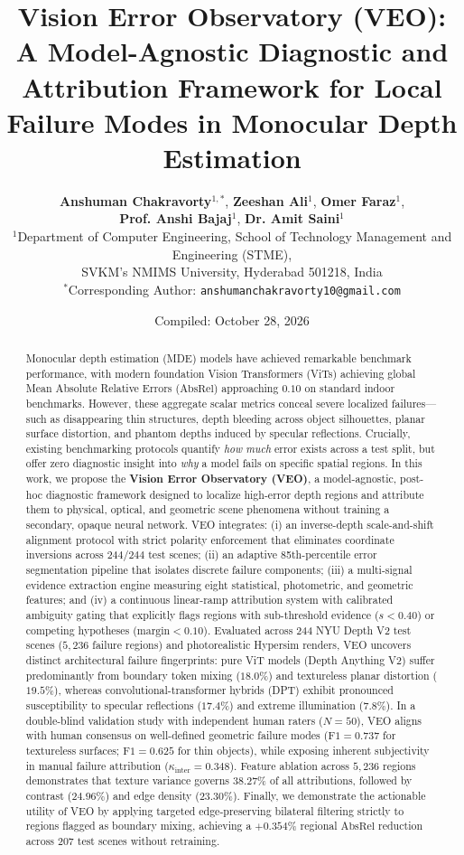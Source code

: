 \documentclass[11pt,a4paper]{article}
\title{\textbf{\Large Vision Error Observatory (VEO): A Model-Agnostic Diagnostic and Attribution Framework for Local Failure Modes in Monocular Depth Estimation}}
\author{
  \textbf{Anshuman Chakravorty}$^{1,*}$, \quad
  \textbf{Zeeshan Ali}$^{1}$, \quad
  \textbf{Omer Faraz}$^{1}$, \\
  \textbf{Prof. Anshi Bajaj}$^{1}$, \quad
  \textbf{Dr. Amit Saini}$^{1}$ \\[0.5em]
  \small $^{1}$Department of Computer Engineering, School of Technology Management and Engineering (STME), \\
  \small SVKM's NMIMS University, Hyderabad 501218, India \\[0.3em]
  \small $^{*}$Corresponding Author: \texttt{anshumanchakravorty10@gmail.com}
}
\date{\small Compiled: October 28, 2026}
\begin{document}
\maketitle

\begin{abstract}
Monocular depth estimation (MDE) models have achieved remarkable benchmark performance, with modern foundation Vision Transformers (ViTs) achieving global Mean Absolute Relative Errors ($\text{AbsRel}$) approaching $0.10$ on standard indoor benchmarks. However, these aggregate scalar metrics conceal severe localized failures—such as disappearing thin structures, depth bleeding across object silhouettes, planar surface distortion, and phantom depths induced by specular reflections. Crucially, existing benchmarking protocols quantify \textit{how much} error exists across a test split, but offer zero diagnostic insight into \textit{why} a model fails on specific spatial regions. In this work, we propose the \textbf{Vision Error Observatory (VEO)}, a model-agnostic, post-hoc diagnostic framework designed to localize high-error depth regions and attribute them to physical, optical, and geometric scene phenomena without training a secondary, opaque neural network. VEO integrates: (i) an inverse-depth scale-and-shift alignment protocol with strict polarity enforcement that eliminates coordinate inversions across $244/244$ test scenes; (ii) an adaptive 85th-percentile error segmentation pipeline that isolates discrete failure components; (iii) a multi-signal evidence extraction engine measuring eight statistical, photometric, and geometric features; and (iv) a continuous linear-ramp attribution system with calibrated ambiguity gating that explicitly flags regions with sub-threshold evidence ($s < 0.40$) or competing hypotheses ($\text{margin} < 0.10$). Evaluated across 244 NYU Depth V2 test scenes ($5,236$ failure regions) and photorealistic Hypersim renders, VEO uncovers distinct architectural failure fingerprints: pure ViT models (Depth Anything V2) suffer predominantly from boundary token mixing ($18.0\%$) and textureless planar distortion ($19.5\%$), whereas convolutional-transformer hybrids (DPT) exhibit pronounced susceptibility to specular reflections ($17.4\%$) and extreme illumination ($7.8\%$). In a double-blind validation study with independent human raters ($N=50$), VEO aligns with human consensus on well-defined geometric failure modes ($\text{F1} = 0.737$ for textureless surfaces; $\text{F1} = 0.625$ for thin objects), while exposing inherent subjectivity in manual failure attribution ($\kappa_{\text{inter}} = 0.348$). Feature ablation across $5,236$ regions demonstrates that texture variance governs $38.27\%$ of all attributions, followed by contrast ($24.96\%$) and edge density ($23.30\%$). Finally, we demonstrate the actionable utility of VEO by applying targeted edge-preserving bilateral filtering strictly to regions flagged as boundary mixing, achieving a $+0.354\%$ regional $\text{AbsRel}$ reduction across 207 test scenes without retraining.
\end{abstract}
\end{document}
